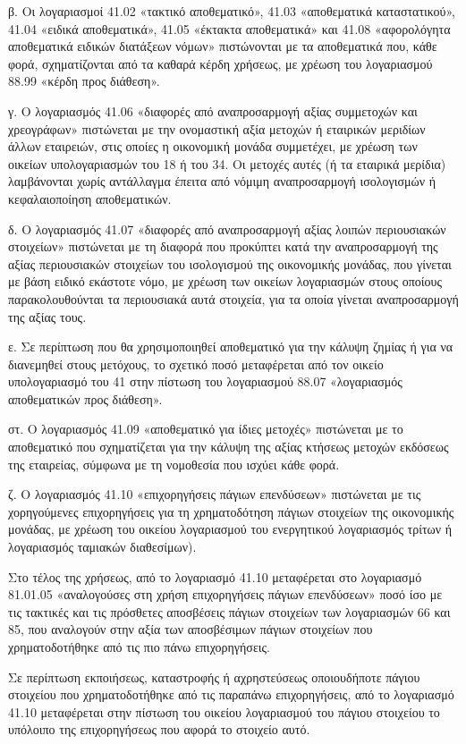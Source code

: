 \documentclass[A4,10pt,greek]{book}
\begin{document}
β. Οι λογαριασμοί 41.02 «τακτικό αποθεματικό», 41.03 «αποθεματικά καταστατικού», 41.04 «ειδικά αποθεματικά», 41.05 «έκτακτα αποθεματικά» και 41.08 «αφορολόγητα αποθεματικά ειδικών διατάξεων νόμων» πιστώνονται με τα αποθεματικά που, κάθε φορά, σχηματίζονται από τα καθαρά κέρδη χρήσεως, με χρέωση του λογαριασμού 88.99 «κέρδη προς διάθεση».

γ. Ο λογαριασμός 41.06 «διαφορές από αναπροσαρμογή αξίας συμμετοχών και χρεογράφων» πιστώνεται με την ονομαστική αξία μετοχών ή εταιρικών μεριδίων άλλων εταιρειών, στις οποίες η οικονομική μονάδα συμμετέχει, με χρέωση των οικείων υπολογαριασμών του 18 ή του 34. Οι μετοχές αυτές (ή τα εταιρικά μερίδια) λαμβάνονται χωρίς αντάλλαγμα έπειτα από νόμιμη αναπροσαρμογή ισολογισμών ή κεφαλαιοποίηση αποθεματικών.

δ. Ο λογαριασμός 41.07 «διαφορές από αναπροσαρμογή αξίας λοιπών περιουσιακών στοιχείων» πιστώνεται με τη διαφορά που προκύπτει κατά την αναπροσαρμογή της αξίας περιουσιακών στοιχείων του ισολογισμού της οικονομικής μονάδας, που γίνεται με βάση ειδικό εκάστοτε νόμο, με χρέωση των οικείων λογαριασμών στους οποίους παρακολουθούνται τα περιουσιακά αυτά στοιχεία, για τα οποία γίνεται αναπροσαρμογή της αξίας τους.

ε. Σε περίπτωση που θα χρησιμοποιηθεί αποθεματικό για την κάλυψη ζημίας ή για να διανεμηθεί στους μετόχους, το σχετικό ποσό μεταφέρεται από τον οικείο υπολογαριασμό του 41 στην πίστωση του λογαριασμού 88.07 «λογαριασμός αποθεματικών προς διάθεση».

στ. Ο λογαριασμός 41.09 «αποθεματικό για ίδιες μετοχές» πιστώνεται με το αποθεματικό που σχηματίζεται για την κάλυψη της αξίας κτήσεως μετοχών εκδόσεως της εταιρείας, σύμφωνα με τη νομοθεσία που ισχύει κάθε φορά. 

ζ. Ο λογαριασμός 41.10 «επιχορηγήσεις πάγιων επενδύσεων» πιστώνεται με τις χορηγούμενες επιχορηγήσεις για τη χρηματοδότηση πάγιων στοιχείων της οικονομικής μονάδας, με χρέωση του οικείου λογαριασμού του ενεργητικού λογαριασμός τρίτων ή λογαριασμός ταμιακών διαθεσίμων).

Στο τέλος της χρήσεως, από το λογαριασμό 41.10 μεταφέρεται στο λογαριασμό 81.01.05 «αναλογούσες στη χρήση επιχορηγήσεις πάγιων επενδύσεων» ποσό ίσο με τις τακτικές και τις πρόσθετες αποσβέσεις πάγιων στοιχείων των λογαριασμών 66 και 85, που αναλογούν στην αξία των αποσβέσιμων πάγιων στοιχείων που χρηματοδοτήθηκε από τις πιο πάνω επιχορηγήσεις.

Σε περίπτωση εκποιήσεως, καταστροφής ή αχρηστεύσεως οποιουδήποτε πάγιου στοιχείου που χρηματοδοτήθηκε από τις παραπάνω επιχορηγήσεις, από το λογαριασμό 41.10 μεταφέρεται στην πίστωση του οικείου λογαριασμού του πάγιου στοιχείου το υπόλοιπο της επιχορηγήσεως που αφορά το στοιχείο αυτό.
\end{document}
